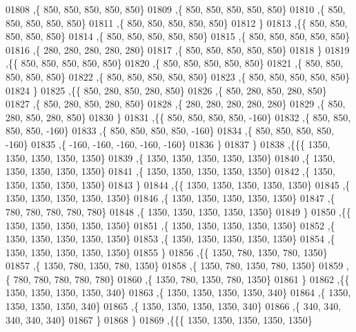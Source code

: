 \begin{DoxyCode}
01808    ,\{   850,   850,   850,   850,   850\}
01809    ,\{   850,   850,   850,   850,   850\}
01810    ,\{   850,   850,   850,   850,   850\}
01811    ,\{   850,   850,   850,   850,   850\}
01812    \}
01813   ,\{\{   850,   850,   850,   850,   850\}
01814    ,\{   850,   850,   850,   850,   850\}
01815    ,\{   850,   850,   850,   850,   850\}
01816    ,\{   280,   280,   280,   280,   280\}
01817    ,\{   850,   850,   850,   850,   850\}
01818    \}
01819   ,\{\{   850,   850,   850,   850,   850\}
01820    ,\{   850,   850,   850,   850,   850\}
01821    ,\{   850,   850,   850,   850,   850\}
01822    ,\{   850,   850,   850,   850,   850\}
01823    ,\{   850,   850,   850,   850,   850\}
01824    \}
01825   ,\{\{   850,   280,   850,   280,   850\}
01826    ,\{   850,   280,   850,   280,   850\}
01827    ,\{   850,   280,   850,   280,   850\}
01828    ,\{   280,   280,   280,   280,   280\}
01829    ,\{   850,   280,   850,   280,   850\}
01830    \}
01831   ,\{\{   850,   850,   850,   850,  -160\}
01832    ,\{   850,   850,   850,   850,  -160\}
01833    ,\{   850,   850,   850,   850,  -160\}
01834    ,\{   850,   850,   850,   850,  -160\}
01835    ,\{  -160,  -160,  -160,  -160,  -160\}
01836    \}
01837   \}
01838  ,\{\{\{  1350,  1350,  1350,  1350,  1350\}
01839    ,\{  1350,  1350,  1350,  1350,  1350\}
01840    ,\{  1350,  1350,  1350,  1350,  1350\}
01841    ,\{  1350,  1350,  1350,  1350,  1350\}
01842    ,\{  1350,  1350,  1350,  1350,  1350\}
01843    \}
01844   ,\{\{  1350,  1350,  1350,  1350,  1350\}
01845    ,\{  1350,  1350,  1350,  1350,  1350\}
01846    ,\{  1350,  1350,  1350,  1350,  1350\}
01847    ,\{   780,   780,   780,   780,   780\}
01848    ,\{  1350,  1350,  1350,  1350,  1350\}
01849    \}
01850   ,\{\{  1350,  1350,  1350,  1350,  1350\}
01851    ,\{  1350,  1350,  1350,  1350,  1350\}
01852    ,\{  1350,  1350,  1350,  1350,  1350\}
01853    ,\{  1350,  1350,  1350,  1350,  1350\}
01854    ,\{  1350,  1350,  1350,  1350,  1350\}
01855    \}
01856   ,\{\{  1350,   780,  1350,   780,  1350\}
01857    ,\{  1350,   780,  1350,   780,  1350\}
01858    ,\{  1350,   780,  1350,   780,  1350\}
01859    ,\{   780,   780,   780,   780,   780\}
01860    ,\{  1350,   780,  1350,   780,  1350\}
01861    \}
01862   ,\{\{  1350,  1350,  1350,  1350,   340\}
01863    ,\{  1350,  1350,  1350,  1350,   340\}
01864    ,\{  1350,  1350,  1350,  1350,   340\}
01865    ,\{  1350,  1350,  1350,  1350,   340\}
01866    ,\{   340,   340,   340,   340,   340\}
01867    \}
01868   \}
01869  ,\{\{\{  1350,  1350,  1350,  1350,  1350\}

\end{DoxyCode}
